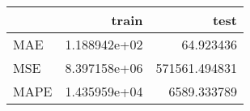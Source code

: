 \begin{tabular}{lrr}
\toprule
{} &         train &           test \\
\midrule
MAE  &  1.188942e+02 &      64.923436 \\
MSE  &  8.397158e+06 &  571561.494831 \\
MAPE &  1.435959e+04 &    6589.333789 \\
\bottomrule
\end{tabular}
